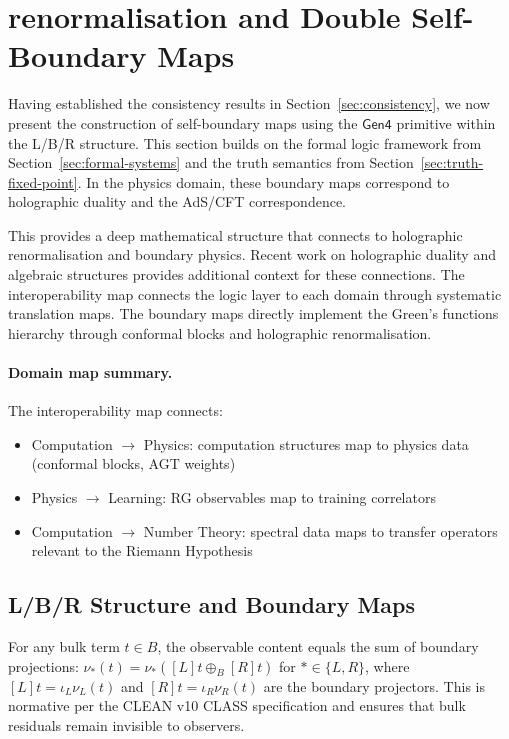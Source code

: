 \section{renormalisation and Double Self-Boundary Maps}
\label{sec:boundary-maps}

Having established the consistency results in Section~\ref{sec:consistency}, we now present the construction of self-boundary maps using the $\mathsf{Gen4}$ primitive within the L/B/R structure. This section builds on the formal logic framework from Section~\ref{sec:formal-systems} and the truth semantics from Section~\ref{sec:truth-fixed-point}. In the physics domain, these boundary maps correspond to holographic duality and the AdS/CFT correspondence.

This provides a deep mathematical structure that connects to holographic renormalisation \cite{henningson1998,deharo2001} and boundary physics. Recent work on holographic duality and algebraic structures \cite{costello2023} provides additional context for these connections. The interoperability map connects the logic layer to each domain through systematic translation maps. The boundary maps directly implement the Green's functions hierarchy through conformal blocks and holographic renormalisation.

\paragraph{Domain map summary.} The interoperability map connects:
\begin{itemize}
  \item Computation $\to$ Physics: computation structures map to physics data (conformal blocks, AGT weights)
  \item Physics $\to$ Learning: RG observables map to training correlators
  \item Computation $\to$ Number Theory: spectral data maps to transfer operators relevant to the Riemann Hypothesis
\end{itemize}

\subsection{L/B/R Structure and Boundary Maps}

\begin{definition}[Bulk = Two Boundaries Principle]
\label{def:bulk-equals-boundaries}
For any bulk term $t \in B$, the observable content equals the sum of boundary projections: $\nu_*(t) = \nu_*([L]t \oplus_B [R]t)$ for $* \in \{L,R\}$, where $[L]t = \iota_L \nu_L(t)$ and $[R]t = \iota_R \nu_R(t)$ are the boundary projectors. This is normative per the CLEAN v10 CLASS specification and ensures that bulk residuals remain invisible to observers.
\end{definition}

